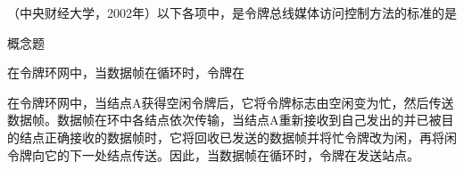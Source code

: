 \question （中央财经大学，2002年）以下各项中，是令牌总线媒体访问控制方法的标准的是
\par{}
\begin{solution}概念题
\end{solution}
\question 在令牌环网中，当数据帧在循环时，令牌在
\par{}
\begin{solution}在令牌环网中，当结点A获得空闲令牌后，它将令牌标志由空闲变为忙，然后传送数据帧。数据帧在环中各结点依次传输，当结点A重新接收到自己发出的并已被目的结点正确接收的数据帧时，它将回收已发送的数据帧并将忙令牌改为闲，再将闲令牌向它的下一处结点传送。因此，当数据帧在循环时，令牌在发送站点。
\end{solution}
